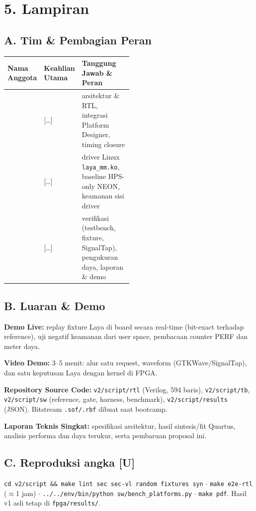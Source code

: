 \documentclass[10pt]{article}
\newcommand{\hd}[1]{\cellcolor{thg}\textbf{#1}}
\newcommand{\code}[1]{\texttt{\small #1}}
\begin{document}
\section{5. Lampiran}

\subsection*{A. Tim \& Pembagian Peran}

{\small
\begin{tabularx}{\linewidth}{|p{0.22\linewidth}|p{0.28\linewidth}|L|}
\hline
\hd{Nama Anggota} & \hd{Keahlian Utama} & \hd{Tanggung Jawab \& Peran} \\  & [\dots] & arsitektur \& RTL, integrasi Platform Designer, timing closure \\  & [\dots] & driver Linux \code{laya\_mm.ko}, baseline HPS-only NEON, keamanan sisi driver \\  & [\dots] & verifikasi (testbench, fixture, SignalTap), pengukuran daya, laporan \& demo \\ \hline
\end{tabularx}}

\subsection*{B. Luaran \& Demo}
\textbf{Demo Live:} replay fixture Laya di board secara real-time (bit-exact terhadap reference), uji negatif keamanan dari user space, pembacaan counter PERF dan meter daya.

\textbf{Video Demo:} 3--5 menit: alur satu request, waveform (GTKWave/SignalTap), dan satu keputusan Laya dengan kernel di FPGA.

\textbf{Repository Source Code:} \code{v2/script/rtl} (Verilog, 594 baris), \code{v2/script/tb}, \code{v2/script/sw} (reference, gate, harness, benchmark), \code{v2/script/results} (JSON). Bitstream \code{.sof/.rbf} dibuat saat bootcamp.

\textbf{Laporan Teknis Singkat:} spesifikasi arsitektur, hasil sintesis/fit Quartus, analisis performa dan daya terukur, serta pembaruan proposal ini.

\subsection*{C. Reproduksi angka [U]}
{\small\code{cd v2/script \&\& make lint sec sec-vl random fixtures syn} $\cdot$ \code{make e2e-rtl} ($\approx$1 jam) $\cdot$ \code{../../env/bin/python sw/bench\_platforms.py} $\cdot$ \code{make pdf}. Hasil v1 asli tetap di \code{fpga/results/}.}
\end{document}
